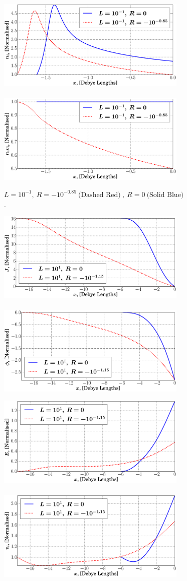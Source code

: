 \documentclass[aip,apl,reprint]{revtex4-1}
\begin{document}
\begin{figure}
\begin{subfigure}[c]{\linewidth}
			\includegraphics[width=0.44\linewidth]{4_-1l.eps}
			~
			\includegraphics[width=0.44\linewidth]{6_-1l.eps}
			\vspace{-0.3cm}
			\caption{$ L = 10^{-1},~ R = -10^{-0.85}~\textrm{(Dashed Red)}~,~ R = 0~\textrm{(Solid Blue)} $.}
			\label{sf:rslta}
		\end{subfigure}		
		\begin{subfigure}[c]{\linewidth}
			\centering
			\includegraphics[width=0.44\linewidth]{0_1l.eps}
			~
			\includegraphics[width=0.44\linewidth]{1_1l.eps}
			
			\includegraphics[width=0.44\linewidth]{2_1l.eps}
			~
			\includegraphics[width=0.44\linewidth]{3_1l.eps}
			

\end{subfigure}
\end{figure}
\end{document}
